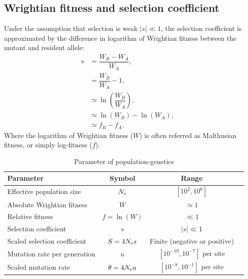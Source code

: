 \subsection{Wrightian fitness and selection coefficient}

Under the assumption that selection is weak $|s| \ll 1$, the selection coefficient is approximated by the difference in logarithm of Wrightian fitness between the mutant and resident \gls{allele}:
\begin{align}
s & = \dfrac{W_{B} - W_{A}}{W_{A}}, \\
& = \dfrac{W_{B}}{W_{A}} - 1, \\
& \simeq \ln\left( \dfrac{W_{B}}{W_{A}} \right), \\
& \simeq \ln(W_{B}) - \ln(W_{A}), \\
& \simeq f_{B} - f_{A}.
\end{align}
Where the logarithm of Wrightian fitness ($W$) is often referred as Malthusian fitness, or simply log-fitness ($f$).

\begin{table}[H]
	\begin{center}
		\begin{tabular}{|l|c|c|c|}
			\hline
			Parameter & Symbol & Range \\
			\hline
			Effective population size & $N_{\textrm{e}}$ & $ [10^2, 10^6]$ \\
			Absolute Wrightian fitness & $W$ & $ \simeq 1 $ \\
			Relative fitness & $f=\ln(W)$ & $ \ll 1 $ \\
			Selection coefficient & $s$ & $ |s| \ll 1 $ \\
			Scaled selection coefficient & $S=4 N_{\textrm{e}} s$ & Finite (negative or positive) \\
			Mutation rate per generation & $u$ & $[10^{-10}, 10^{-7}]$ per site \\
			Scaled mutation rate & $\theta = 4 N_{\textrm{e}} u$ & $[10^{-8}, 10^{-1}]$ per site \\
			\hline
		\end{tabular}
	\end{center}
	\caption[Parameter of population-genetics]{Parameter of population-genetics}\label{table:params-popgen}
\end{table}


